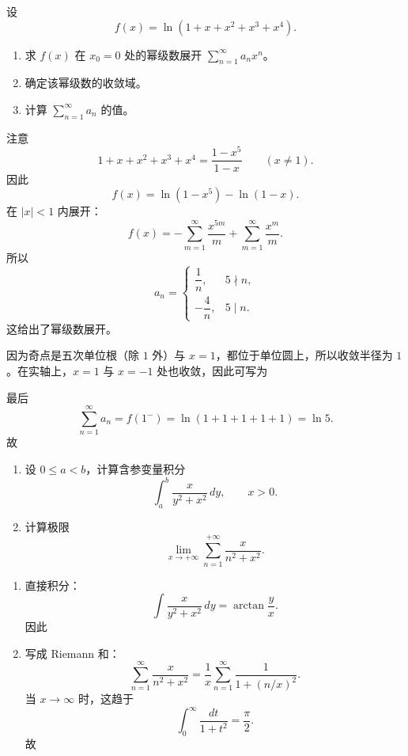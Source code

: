 \begin{question}[幂级数展开]

设
\[
 f(x)=\ln(1+x+x^2+x^3+x^4).
\]
\begin{enumerate}[label=(\arabic*),leftmargin=2.6em,itemsep=0.25em,topsep=0.2em]
\item 求 $f(x)$ 在 $x_0=0$ 处的幂级数展开 $\sum_{n=1}^{\infty}a_nx^n$。
\item 确定该幂级数的收敛域。
\item 计算 $\sum_{n=1}^{\infty}a_n$ 的值。
\end{enumerate}

\begin{solution}

注意
\[
1+x+x^2+x^3+x^4=\frac{1-x^5}{1-x}\qquad (x\ne1).
\]
因此
\[
 f(x)=\ln(1-x^5)-\ln(1-x).
\]
在 $|x|<1$ 内展开：
\[
 f(x)=-\sum_{m=1}^{\infty}\frac{x^{5m}}{m}+\sum_{m=1}^{\infty}\frac{x^m}{m}.
\]
所以
\[
 a_n=
 \begin{cases}
 \dfrac1n, & 5\nmid n,\\
 -\dfrac4n, & 5\mid n.
 \end{cases}
\]
这给出了幂级数展开。

因为奇点是五次单位根（除 $1$ 外）与 $x=1$，都位于单位圆上，所以收敛半径为 $1$。在实轴上，$x=1$ 与 $x=-1$ 处也收敛，因此可写为

最后
\[
\sum_{n=1}^{\infty}a_n=f(1^-)=\ln(1+1+1+1+1)=\ln 5.
\]
故

\end{solution}
\end{question}

\begin{question}[积分与极限]

\begin{enumerate}[label=(\arabic*),leftmargin=2.6em,itemsep=0.25em,topsep=0.2em]
\item 设 $0\le a<b$，计算含参变量积分
\[
\int_a^b\frac{x}{y^2+x^2}\,dy,\qquad x>0.
\]
\item 计算极限
\[
\lim_{x\to+\infty}\sum_{n=1}^{+\infty}\frac{x}{n^2+x^2}.
\]
\end{enumerate}

\begin{solution}

\begin{enumerate}[label=(\arabic*),leftmargin=2.6em,itemsep=0.25em,topsep=0.2em]
\item 直接积分：
\[
\int\frac{x}{y^2+x^2}\,dy=\arctan\frac{y}{x}.
\]
因此

\item 写成 Riemann 和：
\[
\sum_{n=1}^{\infty}\frac{x}{n^2+x^2}
=\frac1x\sum_{n=1}^{\infty}\frac{1}{1+(n/x)^2}.
\]
当 $x\to\infty$ 时，这趋于
\[
\int_0^{\infty}\frac{dt}{1+t^2}=\frac{\pi}{2}.
\]
故
\end{enumerate}

\end{solution}
\end{question}

